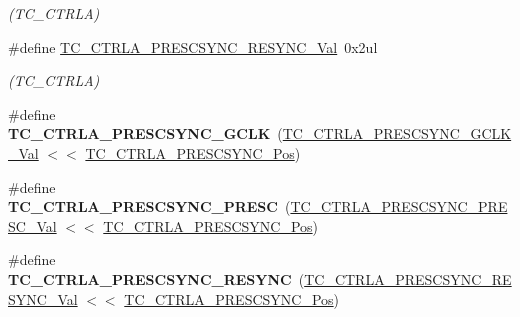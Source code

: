 \begin{DoxyCompactItemize}
\begin{DoxyCompactList}\small\item\em (T\+C\+\_\+\+C\+T\+R\+L\+A) \end{DoxyCompactList}\item 
\hypertarget{group___s_a_m_l21___t_c_ga75ae69c5919b518cf335a19768f1e4e1}{}\#define \hyperlink{group___s_a_m_l21___t_c_ga75ae69c5919b518cf335a19768f1e4e1}{T\+C\+\_\+\+C\+T\+R\+L\+A\+\_\+\+P\+R\+E\+S\+C\+S\+Y\+N\+C\+\_\+\+R\+E\+S\+Y\+N\+C\+\_\+\+Val}~0x2ul\label{group___s_a_m_l21___t_c_ga75ae69c5919b518cf335a19768f1e4e1}

\begin{DoxyCompactList}\small\item\em (T\+C\+\_\+\+C\+T\+R\+L\+A) \end{DoxyCompactList}\item 
\hypertarget{group___s_a_m_l21___t_c_ga55eefe204bcee4afbf66e34f621988e9}{}\#define {\bfseries T\+C\+\_\+\+C\+T\+R\+L\+A\+\_\+\+P\+R\+E\+S\+C\+S\+Y\+N\+C\+\_\+\+G\+C\+L\+K}~(\hyperlink{group___s_a_m_l21___t_c_gafe7113a1b787ad78681b2eafb2af17ad}{T\+C\+\_\+\+C\+T\+R\+L\+A\+\_\+\+P\+R\+E\+S\+C\+S\+Y\+N\+C\+\_\+\+G\+C\+L\+K\+\_\+\+Val}   $<$$<$ \hyperlink{group___s_a_m_l21___t_c_ga9791c4a6d8cb12aa2b14d4fce3653c70}{T\+C\+\_\+\+C\+T\+R\+L\+A\+\_\+\+P\+R\+E\+S\+C\+S\+Y\+N\+C\+\_\+\+Pos})\label{group___s_a_m_l21___t_c_ga55eefe204bcee4afbf66e34f621988e9}

\item 
\hypertarget{group___s_a_m_l21___t_c_gabfdc1206240d9b100341a30f079ec28b}{}\#define {\bfseries T\+C\+\_\+\+C\+T\+R\+L\+A\+\_\+\+P\+R\+E\+S\+C\+S\+Y\+N\+C\+\_\+\+P\+R\+E\+S\+C}~(\hyperlink{group___s_a_m_l21___t_c_ga624a051941bebc564f66db4b57927925}{T\+C\+\_\+\+C\+T\+R\+L\+A\+\_\+\+P\+R\+E\+S\+C\+S\+Y\+N\+C\+\_\+\+P\+R\+E\+S\+C\+\_\+\+Val}  $<$$<$ \hyperlink{group___s_a_m_l21___t_c_ga9791c4a6d8cb12aa2b14d4fce3653c70}{T\+C\+\_\+\+C\+T\+R\+L\+A\+\_\+\+P\+R\+E\+S\+C\+S\+Y\+N\+C\+\_\+\+Pos})\label{group___s_a_m_l21___t_c_gabfdc1206240d9b100341a30f079ec28b}

\item 
\hypertarget{group___s_a_m_l21___t_c_gad1d9b02bd88efa6c42e2b8e302098e38}{}\#define {\bfseries T\+C\+\_\+\+C\+T\+R\+L\+A\+\_\+\+P\+R\+E\+S\+C\+S\+Y\+N\+C\+\_\+\+R\+E\+S\+Y\+N\+C}~(\hyperlink{group___s_a_m_l21___t_c_ga75ae69c5919b518cf335a19768f1e4e1}{T\+C\+\_\+\+C\+T\+R\+L\+A\+\_\+\+P\+R\+E\+S\+C\+S\+Y\+N\+C\+\_\+\+R\+E\+S\+Y\+N\+C\+\_\+\+Val} $<$$<$ \hyperlink{group___s_a_m_l21___t_c_ga9791c4a6d8cb12aa2b14d4fce3653c70}{T\+C\+\_\+\+C\+T\+R\+L\+A\+\_\+\+P\+R\+E\+S\+C\+S\+Y\+N\+C\+\_\+\+Pos})\label{group___s_a_m_l21___t_c_gad1d9b02bd88efa6c42e2b8e302098e38}


\end{DoxyCompactItemize}
